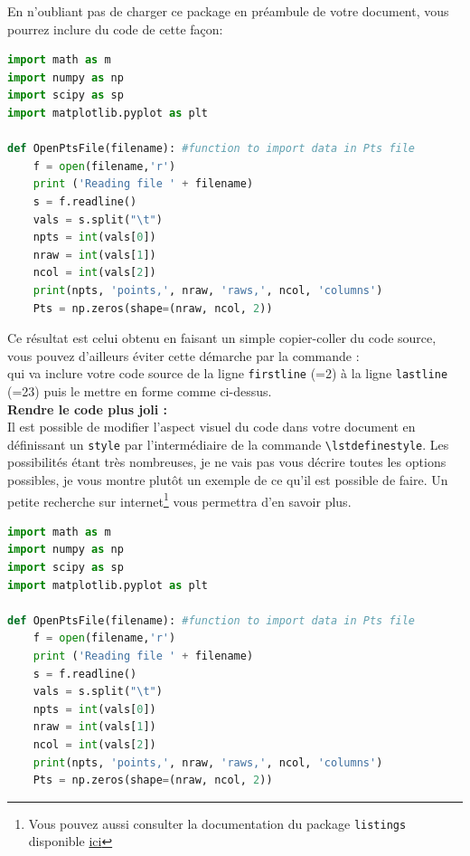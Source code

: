 \documentclass[11pt]{article}				%
\begin{document}
En n'oubliant pas de charger ce package en préambule de votre document, vous pourrez inclure du code de cette façon:

\begin{lstlisting}[language=Python]
import math as m
import numpy as np
import scipy as sp
import matplotlib.pyplot as plt

def OpenPtsFile(filename): #function to import data in Pts file
	f = open(filename,'r')
	print ('Reading file ' + filename)
	s = f.readline()
	vals = s.split("\t")
	npts = int(vals[0])
	nraw = int(vals[1])
	ncol = int(vals[2])
	print(npts, 'points,', nraw, 'raws,', ncol, 'columns')
	Pts = np.zeros(shape=(nraw, ncol, 2))
\end{lstlisting}

Ce résultat est celui obtenu en faisant un simple copier-coller du code source, vous pouvez d'ailleurs éviter cette démarche par la commande :\\
 \verb|| qui va inclure votre code source de la ligne \texttt{firstline} (=2) à la ligne \texttt{lastline} (=23) puis le mettre en forme comme ci-dessus.\\

\textbf{Rendre le code plus joli :}\\

Il est possible de modifier l'aspect visuel du code dans votre document en définissant un \texttt{style} par l'intermédiaire de la commande \verb|\lstdefinestyle|. Les possibilités étant très nombreuses, je ne vais pas vous décrire toutes les options possibles, je vous montre plutôt un exemple de ce qu'il est possible de faire. Un petite recherche sur internet\footnote{Vous pouvez aussi consulter la documentation du package \texttt{listings} disponible \href{https://ctan.gutenberg.eu.org/macros/latex/contrib/listings/listings.pdf}{ici}} vous permettra d'en savoir plus.\\

\lstset{style=mystyle}
\begin{lstlisting}[language=Python]
import math as m
import numpy as np
import scipy as sp
import matplotlib.pyplot as plt

def OpenPtsFile(filename): #function to import data in Pts file
	f = open(filename,'r')
	print ('Reading file ' + filename)
	s = f.readline()
	vals = s.split("\t")
	npts = int(vals[0])
	nraw = int(vals[1])
	ncol = int(vals[2])
	print(npts, 'points,', nraw, 'raws,', ncol, 'columns')
	Pts = np.zeros(shape=(nraw, ncol, 2))
\end{lstlisting}  
\end{document}
